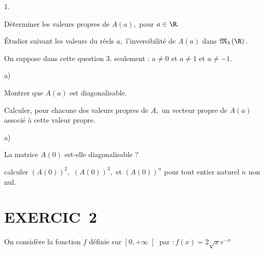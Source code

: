 \documentclass[11pt]{article}%
\begin{document}
\begin{noliste}{1.}
 \setlength{\itemsep}{4mm}
\item Déterminer les valeurs propres de $A\left( a\right),$ pour $a\in 
\R.$

\item Étudier suivant les valeurs du réels $a,$ l'inversibilité de
$A\left(
a\right) $ dans $\mathfrak{M}_{3}\left( \R\right).$

\item On suppose dans cette question 3. seulement : $a\ne 0$ et $a\ne
1$ et $a\ne -1.$

\begin{noliste}{a)}
 \setlength{\itemsep}{2mm}
\item Montrer que $A\left( a\right) $ est diagonalisable.

\item Calculer, pour chacune des valeurs propres de $A,$ un vecteur
propre
de $A\left( a\right) $ associé à cette valeur propre.
\end{noliste}

\item 

\begin{noliste}{a)}
 \setlength{\itemsep}{2mm}
\item La matrice $A\left( 0\right) $ est-elle diagonalisable ?

\item calculer $\left( A\left( 0\right) \right) ^{2},$ $\left( A\left(
0\right) \right) ^{3},$ et $\left( A\left( 0\right) \right) ^{n}$ pour
tout
entier naturel $n$ non nul.
\end{noliste}
\end{noliste}

\section*{EXERCIC\E\ 2}

On considère la fonction $f$ définie sur $\left[ 0, + \infty \right[ $
par $ :f\left( x\right) = 2\sqrt{x}e^{-x}$
\end{document}
